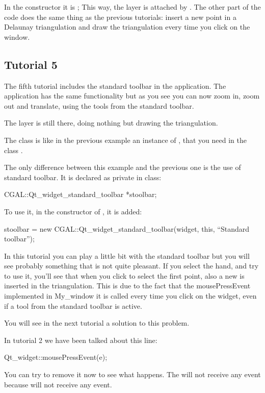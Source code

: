 In the constructor it is ; This way, the layer is
attached by . The other part of the code does the same
thing as the previous tutorials: insert a new point in a Delaunay
triangulation and draw the triangulation every time you click on the window.

\subsection*{Tutorial 5}

The fifth tutorial includes the standard toolbar in the
application. The application has the same functionality but as you
see you can now zoom in, zoom out and translate, using the tools from
the standard toolbar.

The layer is still there, doing nothing but drawing the triangulation.

The class  is like in the previous example an instance of
, that you need in the class .

The only difference between this example and the previous one is the
use of standard toolbar. It is declared as private in  class:
\begin{ccExampleCode}
CGAL::Qt_widget_standard_toolbar *stoolbar;
\end{ccExampleCode}
To use it, in the constructor of , it is added:
\begin{ccExampleCode}
stoolbar = new CGAL::Qt_widget_standard_toolbar(widget, this, ``Standard toolbar'');
\end{ccExampleCode}
In this tutorial you can play a little bit with the standard toolbar
but you will see probably something that is not quite pleasant. If you
select the hand, and try to use it, you'll see that when you click to
select the first point, also a new  is inserted in the
triangulation. This is due to the fact that the mousePressEvent
implemented in My\_window it is called every time you click on the
widget, even if a tool from the standard toolbar is active.

You will see in the next tutorial a solution to this problem.

\begin{ccAdvanced}
In tutorial 2 we have been talked about this line:
\begin{ccExampleCode}
Qt_widget::mousePressEvent(e);
\end{ccExampleCode}
You can try to remove it now to see what happens. The 
will not receive any event because  will not receive
any event.
\end{ccAdvanced}

